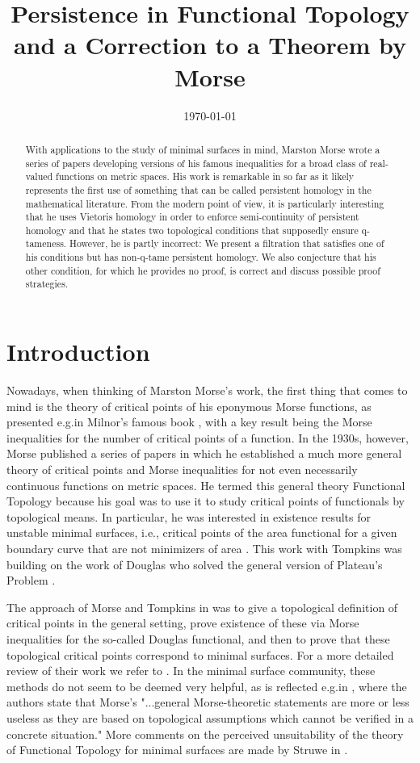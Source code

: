 \documentclass{amsart}
\title{Persistence in Functional Topology and a Correction to a Theorem by Morse}
\author{}
\date{\today}
\theoremstyle{plain}
\theoremstyle{definition}
\begin{document}
\maketitle
\begin{abstract}
With applications to the study of minimal surfaces in mind, Marston Morse wrote a series of papers developing versions of his famous inequalities for a broad class of real-valued functions on metric spaces. His work is remarkable in so far as it likely represents the first use of something that can be called persistent homology in the mathematical literature. From the modern point of view, it is particularly interesting that he uses Vietoris homology in order to enforce semi-continuity of persistent homology and that he states two topological conditions that supposedly ensure q-tameness. However, he is partly incorrect: We present a filtration that satisfies one of his conditions but has non-q-tame persistent homology. We also conjecture that his other condition, for which he provides no proof, is correct and discuss possible proof strategies.
\end{abstract}

\section{Introduction}
Nowadays, when thinking of Marston Morse's work, the first thing that comes to mind is the theory of critical points of his eponymous Morse functions, as presented e.g.\@ in Milnor's famous book \cite{MR0163331}, with a key result being the Morse inequalities for the number of critical points of a function. In the 1930s, however, Morse published a series of papers \cite{Morse.1937, Morse.1938, Morse.1940, MR9102} in which he established a much more general theory of critical points and Morse inequalities for not even necessarily continuous functions on metric spaces. He termed this general theory Functional Topology because his goal was to use it to study critical points of functionals by topological means. In particular, he was interested in existence results for unstable minimal surfaces, i.e., critical points of the area functional for a given boundary curve that are not minimizers of area \cite{Morse.1939,Morse.1941}. This work with Tompkins was building on the work of Douglas who solved the general version of Plateau's Problem \cite{Douglas.1931}.

The approach of Morse and Tompkins in \cite{Morse.1939} was to give a topological definition of critical points in the general setting, prove existence of these via Morse inequalities for the so-called Douglas functional, and then to prove that these topological critical points correspond to minimal surfaces. For a more detailed review of their work we refer to \cite{Struwe.1988}. In the minimal surface community, these methods do not seem to be deemed very helpful, as is reflected e.g.\@ in \cite[p.472]{MR2566897}, where the authors state that Morse's "...general Morse-theoretic statements are more or less useless as they are based on topological assumptions which cannot be verified in a concrete situation." More comments on the perceived unsuitability of the theory of Functional Topology for minimal surfaces are made by Struwe in \cite{MR850612}. 
\end{document}
